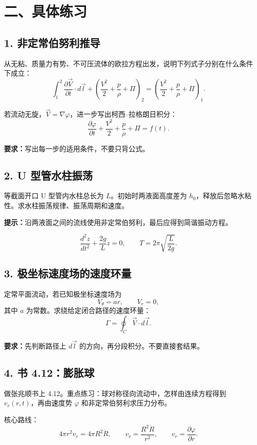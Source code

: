 \documentclass[UTF8,zihao=-4]{ctexart}
\newcommand{\task}[1]{\textbf{#1}}
\begin{document}
\section*{二、具体练习}

\subsection*{1. 非定常伯努利推导}

从无粘、质量力有势、不可压流体的欧拉方程出发，说明下列式子分别在什么条件下成立：
\[
\int_1^2 \frac{\partial \vec V}{\partial t}\cdot d\vec l
+\left(\frac{V^2}{2}+\frac{p}{\rho}+\Pi\right)_2
=
\left(\frac{V^2}{2}+\frac{p}{\rho}+\Pi\right)_1 .
\]

若流动无旋，$\vec V=\nabla\varphi$，进一步写出柯西--拉格朗日积分：
\[
\frac{\partial \varphi}{\partial t}
+\frac{V^2}{2}+\frac{p}{\rho}+\Pi=f(t).
\]

\task{要求：}写出每一步的适用条件，不要只背公式。

\subsection*{2. U 型管水柱振荡}

等截面开口 U 型管内水柱总长为 $L$。初始时两液面高度差为 $h_0$，释放后忽略水粘性。求水柱振荡规律、振荡周期和速度。

\task{提示：}沿两液面之间的流线使用非定常伯努利，最后应得到简谐振动方程。

\[
\frac{d^2 z}{dt^2}+\frac{2g}{L}z=0,
\qquad
T=2\pi\sqrt{\frac{L}{2g}}.
\]

\subsection*{3. 极坐标速度场的速度环量}

定常平面流动，若已知极坐标速度场为
\[
V_\theta=ar,\qquad V_r=0,
\]
其中 $a$ 为常数。求绕给定闭合路径的速度环量：
\[
\Gamma=\oint_C \vec V\cdot d\vec l.
\]

\task{要求：}先判断路径上 $d\vec l$ 的方向，再分段积分。不要直接套结果。

\subsection*{4. 书 4.12：膨胀球}

做张兆顺书上 4.12。重点练习：球对称径向流动中，怎样由连续方程得到 $v_r(r,t)$，再由速度势 $\varphi$ 和非定常伯努利求压力分布。

核心路线：
\[
4\pi r^2v_r=4\pi R^2\dot R,
\qquad
v_r=\frac{R^2\dot R}{r^2},
\qquad
v_r=\frac{\partial \varphi}{\partial r}.
\]
\end{document}
